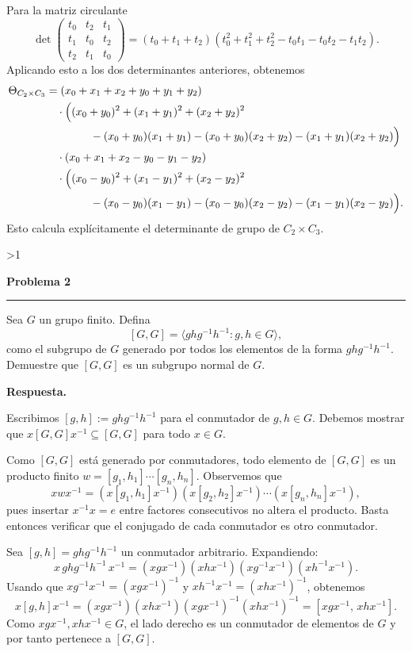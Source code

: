 \documentclass[10pt,a4paper]{article}
\newcommand{\inlinehead}[2][repblue]{%
  \par\smallskip
  {\color{#1}\bfseries #2.}\hspace{0.45em}%
}
\newcommand{\answer}{\inlinehead{Respuesta}}
\newcounter{probcnt}
\newcommand{\problem}[2]{%
  \stepcounter{probcnt}%
  \ifnum\value{probcnt}>1\newpage\fi
  \par\vspace{0.25em}
  {\large\bfseries\color{repblue} Problema #1}\par
  {\color{repline}\rule{\linewidth}{0.55pt}}\par
  \begin{tcolorbox}[
    breakable,
    colback=white,
    colframe=repline,
    borderline west={1.6pt}{0pt}{repteal},
    left=0.7em,
    right=0.7em,
    top=0.35em,
    bottom=0.3em,
    before skip=0.35em,
    after skip=0.45em
  ]
    #2
  \end{tcolorbox}
}
\begin{document}
Para la matriz circulante
\[
  \det
  \begin{pmatrix}
    t_0 & t_2 & t_1\\
    t_1 & t_0 & t_2\\
    t_2 & t_1 & t_0
  \end{pmatrix}
  =(t_0+t_1+t_2)(t_0^2+t_1^2+t_2^2-t_0t_1-t_0t_2-t_1t_2).
\]
Aplicando esto a los dos determinantes anteriores, obtenemos
\begin{align*}
  \Theta_{C_2\times C_3}
  &= (x_0+x_1+x_2+y_0+y_1+y_2) \\
  &\quad\cdot \Bigl((x_0+y_0)^2+(x_1+y_1)^2+(x_2+y_2)^2 \\
  &\qquad\qquad -(x_0+y_0)(x_1+y_1)-(x_0+y_0)(x_2+y_2)-(x_1+y_1)(x_2+y_2)\Bigr) \\
  &\quad\cdot (x_0+x_1+x_2-y_0-y_1-y_2) \\
  &\quad\cdot \Bigl((x_0-y_0)^2+(x_1-y_1)^2+(x_2-y_2)^2 \\
  &\qquad\qquad -(x_0-y_0)(x_1-y_1)-(x_0-y_0)(x_2-y_2)-(x_1-y_1)(x_2-y_2)\Bigr).
\end{align*}
Esto calcula explícitamente el determinante de grupo de $C_2 \times C_3$.
\enlargethispage{2\baselineskip}
\endgroup

\problem{2}{%
Sea $G$ un grupo finito. Defina
\[
  [G,G] = \langle ghg^{-1}h^{-1} : g,h \in G \rangle,
\]
como el subgrupo de $G$ generado por todos los elementos de la forma
$ghg^{-1}h^{-1}$. Demuestre que $[G,G]$ es un subgrupo normal de $G$.
}

\answer
Escribimos $[g,h]:=ghg^{-1}h^{-1}$ para el conmutador de $g,h\in G$.
Debemos mostrar que $x[G,G]x^{-1}\subseteq [G,G]$ para todo $x\in G$.

Como $[G,G]$ está generado por conmutadores, todo elemento de $[G,G]$ es un
producto finito $w=[g_1,h_1]\cdots[g_n,h_n]$.
Observemos que
\[
  xwx^{-1}
  = (x[g_1,h_1]x^{-1})(x[g_2,h_2]x^{-1})\cdots(x[g_n,h_n]x^{-1}),
\]
pues insertar $x^{-1}x=e$ entre factores consecutivos no altera el producto.
Basta entonces verificar que el conjugado de cada conmutador es otro conmutador.

Sea $[g,h]=ghg^{-1}h^{-1}$ un conmutador arbitrario. Expandiendo:
\[
  x\,ghg^{-1}h^{-1}\,x^{-1}
  = (xgx^{-1})(xhx^{-1})(xg^{-1}x^{-1})(xh^{-1}x^{-1}).
\]
Usando que $xg^{-1}x^{-1}=(xgx^{-1})^{-1}$ y
$xh^{-1}x^{-1}=(xhx^{-1})^{-1}$, obtenemos
\[
  x[g,h]x^{-1}
  = (xgx^{-1})(xhx^{-1})(xgx^{-1})^{-1}(xhx^{-1})^{-1}
  = [xgx^{-1},\,xhx^{-1}].
\]
Como $xgx^{-1},xhx^{-1}\in G$, el lado derecho es un conmutador de elementos
de $G$ y por tanto pertenece a $[G,G]$.
\end{document}
